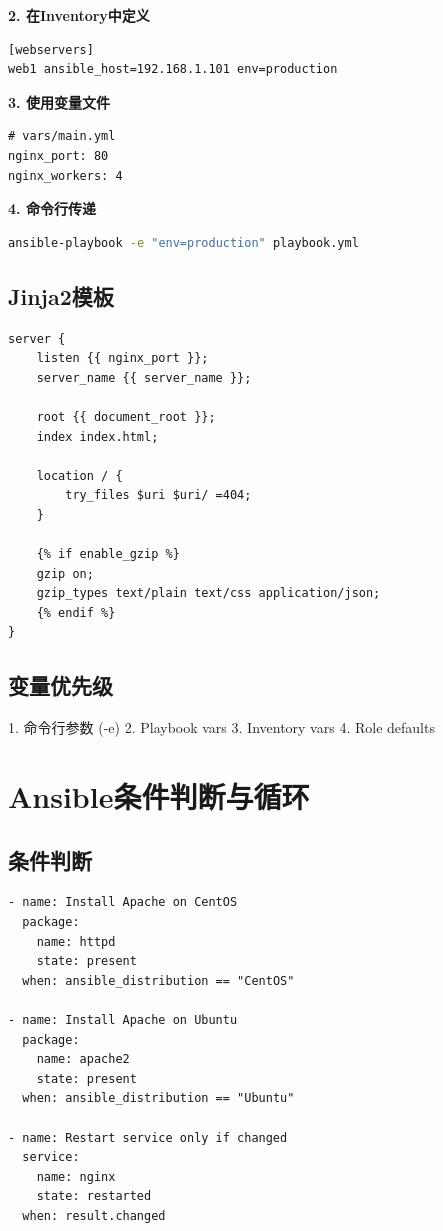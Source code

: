 \documentclass[12pt,UTF8]{ctexbook}
\begin{document}
\textbf{2. 在Inventory中定义}
\begin{lstlisting}
[webservers]
web1 ansible_host=192.168.1.101 env=production
\end{lstlisting}

\textbf{3. 使用变量文件}
\begin{lstlisting}
# vars/main.yml
nginx_port: 80
nginx_workers: 4
\end{lstlisting}

\textbf{4. 命令行传递}
\begin{lstlisting}[language=bash]
ansible-playbook -e "env=production" playbook.yml
\end{lstlisting}

\subsection*{Jinja2模板}
\begin{lstlisting}
server {
    listen {{ nginx_port }};
    server_name {{ server_name }};
    
    root {{ document_root }};
    index index.html;
    
    location / {
        try_files $uri $uri/ =404;
    }
    
    {% if enable_gzip %}
    gzip on;
    gzip_types text/plain text/css application/json;
    {% endif %}
}
\end{lstlisting}

\subsection*{变量优先级}
1. 命令行参数 (-e)
2. Playbook vars
3. Inventory vars
4. Role defaults

\section{Ansible条件判断与循环}
\label{sec:ansible-conditionals}

\subsection*{条件判断}
\begin{lstlisting}
- name: Install Apache on CentOS
  package:
    name: httpd
    state: present
  when: ansible_distribution == "CentOS"

- name: Install Apache on Ubuntu
  package:
    name: apache2
    state: present
  when: ansible_distribution == "Ubuntu"

- name: Restart service only if changed
  service:
    name: nginx
    state: restarted
  when: result.changed
\end{lstlisting}
\end{document}
